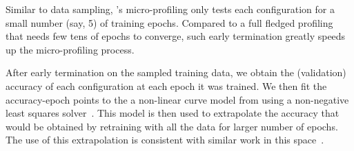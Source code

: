 Similar to data sampling, {\name}'s micro-profiling only tests each configuration for a small number (say, 5) of training epochs.
Compared to a full fledged profiling that needs few tens of epochs to converge, such early termination greatly speeds up the micro-profiling process.

After early termination on the sampled training data, we obtain the (validation) accuracy of each configuration at each epoch it was trained. We then fit the accuracy-epoch points to the a non-linear curve model from \cite{optimus} using a non-negative least squares solver~\cite{nnls}. This model is then used to extrapolate the accuracy that would be obtained by retraining with all the data for larger number of epochs. The use of this extrapolation is consistent with similar work in this space~\cite{themis,optimus}. 

